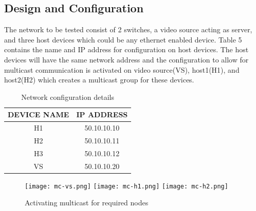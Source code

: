 \documentclass{article}
\begin{document}
\subsection{Design and Configuration}
The network to be tested consist of 2 switches, a video source acting as server, and three host devices which could be any ethernet enabled device. Table 5 contains the name and IP address for configuration on host devices. The host devices will have the same network address and the configuration to allow for multicast communication is activated on video source(VS), host1(H1), and host2(H2) which creates a multicast group for these devices.
    	\begin{table}[h]
        		\centering
        		\begin{tabular}{|c|c|}
            		\hline
            		DEVICE NAME & IP ADDRESS \\
            		\hline
            		H1 & 50.10.10.10 \\
            		H2 & 50.10.10.11 \\
            		H3 & 50.10.10.12 \\
            		VS & 50.10.10.20 \\
            		\hline
        		\end{tabular}
        		\caption{Network configuration details}
        		\label{tab:5}
    	\end{table}
    	\begin{figure}[h]
        		\centering
        		\texttt{[image: mc-vs.png]}
        		\texttt{[image: mc-h1.png]}
        		\texttt{[image: mc-h2.png]}
        		\caption{Activating multicast for required nodes}
        		\label{fig:t4-1}
    	\end{figure}
\end{document}
